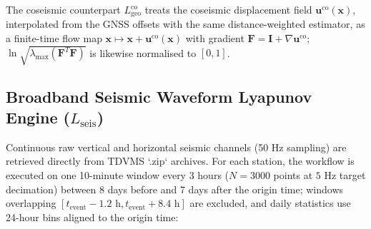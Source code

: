 \documentclass[11pt,a4paper]{article}
\begin{document}
The coseismic counterpart $L_{\text{geo}}^{\text{co}}$ treats the coseismic displacement field $\mathbf{u}^{\text{co}}(\mathbf{x})$, interpolated from the GNSS offsets with the same distance-weighted estimator, as a finite-time flow map $\mathbf{x} \mapsto \mathbf{x} + \mathbf{u}^{\text{co}}(\mathbf{x})$ with gradient $\mathbf{F} = \mathbf{I} + \nabla \mathbf{u}^{\text{co}}$; $\ln\sqrt{\lambda_{\max}(\mathbf{F}^T\mathbf{F})}$ is likewise normalised to $[0, 1]$.

\subsection{Broadband Seismic Waveform Lyapunov Engine (\texorpdfstring{$L_{\text{seis}}$}{L\_seis})}
Continuous raw vertical and horizontal seismic channels (50 Hz sampling) are retrieved directly from TDVMS `.zip` archives. For each station, the workflow is executed on one 10-minute window every 3 hours ($N = 3000$ points at $5\text{ Hz}$ target decimation) between 8 days before and 7 days after the origin time; windows overlapping $[t_{\text{event}} - 1.2\text{ h}, t_{\text{event}} + 8.4\text{ h}]$ are excluded, and daily statistics use 24-hour bins aligned to the origin time:
\end{document}

